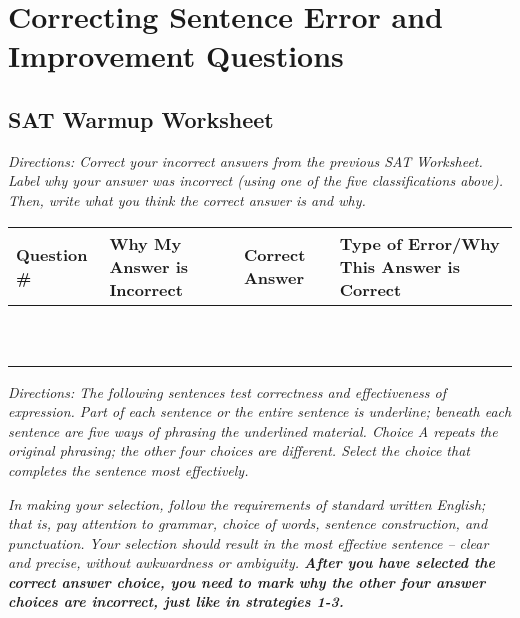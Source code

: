 \section{Correcting Sentence Error and Improvement Questions}

\subsection{SAT Warmup Worksheet}
\textit{Directions: Correct your incorrect answers from the previous SAT Worksheet. Label why your answer
was incorrect (using one of the five classifications above). Then, write what you think the correct
answer is and why.}

\begin{tabularx}{\textwidth}{|>{\centering}X|>{\centering}p{2in}|>{\centering}p{2in}|>{\centering\arraybackslash}X|}\hline
Question \# & Why My Answer is Incorrect & Correct Answer & Type of Error/Why This Answer is Correct\\\hline
& & &\\[2ex]\hline
& & &\\[2ex]\hline
& & &\\[2ex]\hline
& & &\\[2ex]\hline
& & &\\[2ex]\hline
& & &\\[2ex]\hline
& & &\\[2ex]\hline
& & &\\[2ex]\hline
& & &\\[2ex]\hline
& & &\\[2ex]\hline
\end{tabularx}

\newpage
\textit{Directions: The following sentences test correctness and effectiveness of expression. Part of each sentence or the entire sentence is underline; beneath each sentence are five ways of phrasing the underlined material. Choice A repeats the original phrasing; the other four choices are different. Select the choice that completes the sentence most effectively.}

\bigskip
\textit{In making your selection, follow the requirements of standard written English; that is, pay attention to grammar, choice of words, sentence construction, and punctuation. Your selection should result in the most effective sentence -- clear and precise, without awkwardness or ambiguity. \textbf{After you have selected the correct answer choice, you need to mark why the other four answer choices are incorrect, just like in strategies 1-3.}}

